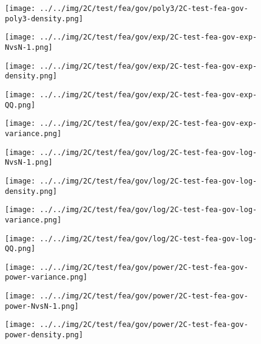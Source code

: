 \begin{figure}[H]
\centering	\texttt{[image: ../../img/2C/test/fea/gov/poly3/2C-test-fea-gov-poly3-density.png]}
\end{figure}
\begin{figure}[H]
\centering	\texttt{[image: ../../img/2C/test/fea/gov/exp/2C-test-fea-gov-exp-NvsN-1.png]}
\end{figure}
\begin{figure}[H]
\centering	\texttt{[image: ../../img/2C/test/fea/gov/exp/2C-test-fea-gov-exp-density.png]}
\end{figure}
\begin{figure}[H]
\centering	\texttt{[image: ../../img/2C/test/fea/gov/exp/2C-test-fea-gov-exp-QQ.png]}
\end{figure}
\begin{figure}[H]
\centering	\texttt{[image: ../../img/2C/test/fea/gov/exp/2C-test-fea-gov-exp-variance.png]}
\end{figure}
\begin{figure}[H]
\centering	\texttt{[image: ../../img/2C/test/fea/gov/log/2C-test-fea-gov-log-NvsN-1.png]}
\end{figure}
\begin{figure}[H]
\centering	\texttt{[image: ../../img/2C/test/fea/gov/log/2C-test-fea-gov-log-density.png]}
\end{figure}
\begin{figure}[H]
\centering	\texttt{[image: ../../img/2C/test/fea/gov/log/2C-test-fea-gov-log-variance.png]}
\end{figure}
\begin{figure}[H]
\centering	\texttt{[image: ../../img/2C/test/fea/gov/log/2C-test-fea-gov-log-QQ.png]}
\end{figure}
\begin{figure}[H]
\centering	\texttt{[image: ../../img/2C/test/fea/gov/power/2C-test-fea-gov-power-variance.png]}
\end{figure}
\begin{figure}[H]
\centering	\texttt{[image: ../../img/2C/test/fea/gov/power/2C-test-fea-gov-power-NvsN-1.png]}
\end{figure}
\begin{figure}[H]
\centering	\texttt{[image: ../../img/2C/test/fea/gov/power/2C-test-fea-gov-power-density.png]}
\end{figure}
